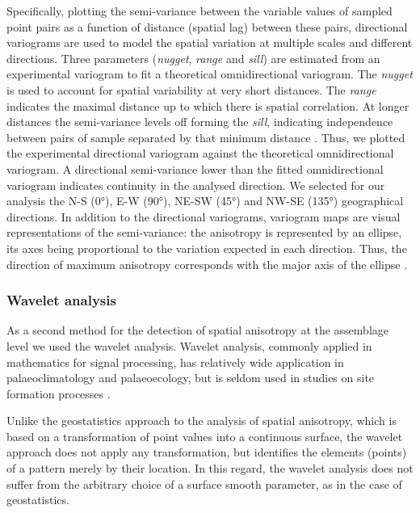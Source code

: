 \documentclass[review,times,authoryear]{elsarticle} %
\begin{document}
Specifically, plotting the semi-variance between the variable values of sampled point pairs as a function of distance (spatial lag) between these pairs, directional variograms are used to model the spatial variation at multiple scales and different directions. Three parameters (\emph{nugget}, \emph{range} and \emph{sill}) are estimated from an experimental variogram to fit a theoretical omnidirectional variogram. The \emph{nugget} is used to account for spatial variability at very short distances. The \emph{range} indicates the maximal distance up to which there is spatial correlation. At longer distances the semi-variance levels off forming the \emph{sill}, indicating independence between pairs of sample separated by that minimum distance \citep{Dale2014,Lloyd2004}. Thus, we plotted the experimental directional variogram against the theoretical omnidirectional variogram. A directional semi-variance lower than the fitted omnidirectional variogram indicates continuity in the analysed direction. We selected for our analysis the N-S (0°), E-W (90°), NE-SW (45°) and NW-SE (135°) geographical directions. In addition to the directional variograms, variogram maps are visual representations of the semi-variance: the anisotropy is represented by an ellipse, its axes being proportional to the variation expected in each direction. Thus, the direction of maximum anisotropy corresponds with the major axis of the ellipse \citep{Legendre2012}.

\subsubsection{Wavelet analysis}

As a second method for the detection of spatial anisotropy at the assemblage level we used the wavelet analysis. Wavelet analysis, commonly applied in mathematics for signal processing, has relatively wide application in palaeoclimatology and palaeoecology, but is seldom used in studies on site formation processes \citep{Markofsky2012}.

Unlike the geostatistics approach to the analysis of spatial anisotropy, which is based on a transformation of point values into a continuous surface, the wavelet approach does not apply any transformation, but identifies the elements (points) of a pattern merely by their location. In this regard, the wavelet analysis does not suffer from the arbitrary choice of a surface smooth parameter, as in the case of geostatistics.
\end{document}
